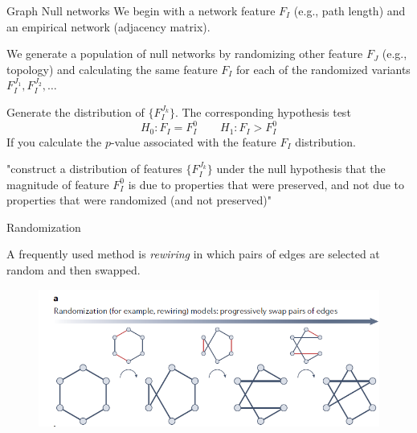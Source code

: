 \documentclass{beamer}
\begin{document}
	\begin{frame}{Graph Null networks}
		We begin with a network feature $F_I$ (e.g., path length) and an empirical network (adjacency matrix).
		
		
		We generate a population of null networks  by randomizing other feature $F_J$ (e.g., topology) and calculating the same feature $F_I$ for each of the randomized variants $F_I^{J_1},F_I^{J_2},\ldots$
		
		Generate the distribution of $\{F_I^{J_k}\}$. The corresponding hypothesis test 
		\begin{equation*}
			H_0\colon F_I=F_I^0 \qquad H_1\colon F_I>F_I^0
		\end{equation*}
		If you calculate the $p$-value associated with the feature $F_I$ distribution. 
		
		"construct a distribution of
		features $\{F_I^{J_k}\}$ under the null hypothesis that the magnitude of feature $F_I^0$ is due
		to properties that were preserved, and not due to properties that were
		randomized (and not preserved)"
		
	\end{frame}
	
	\begin{frame}{Randomization }
		
		A frequently used method is \textit{rewiring} in which pairs of edges are selected at random and then swapped. 
		
		
		\begin{figure}[h]
			\centering
				\includegraphics[scale=0.6]{../Figures/fig_null_models_2.png}
		\end{figure}
	\end{frame}
	
\end{document}
